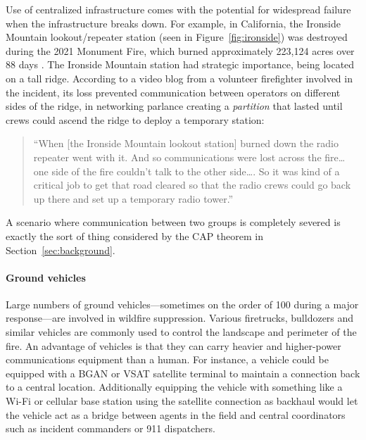\documentclass[]             %
{NASA}                       %
\theoremstyle{definition}
\begin{document}
Use of centralized infrastructure comes with the potential for
widespread failure when the infrastructure breaks down. For example,
in California, the Ironside Mountain lookout/repeater station (seen in
Figure~\ref{fig:ironside}) was destroyed during the 2021 Monument
Fire, which burned approximately 223,124 acres over 88 days
\cite{2021:monumentfire}. The Ironside Mountain station had strategic
importance, being located on a tall ridge. According to a video blog
from a volunteer firefighter involved in the incident, its loss
prevented communication between operators on different sides of the
ridge, in networking parlance creating a \emph{partition} that lasted
until crews could ascend the ridge to deploy a temporary station:
\begin{quote}
  ``When {[}the Ironside Mountain lookout station{]} burned down the
  radio repeater went with it. And so communications were lost across
  the fire\ldots{} one side of the fire couldn't talk to the other
  side\ldots.  So it was kind of a critical job to get that road
  cleared so that the radio crews could go back up there and set up a
  temporary radio tower.'' \cite{2022:mechfire}%
\end{quote}
A scenario where communication between two groups is completely
severed is exactly the sort of thing considered by the CAP theorem in
Section~\ref{sec:background}.

\paragraph{Ground vehicles}
Large numbers of ground vehicles---sometimes on the order of 100
during a major response---are involved in wildfire
suppression. Various firetrucks, bulldozers and similar vehicles are
commonly used to control the landscape and perimeter of the fire. An
advantage of vehicles is that they can carry heavier and higher-power
communications equipment than a human. For instance, a vehicle could
be equipped with a BGAN or VSAT satellite terminal to maintain a
connection back to a central location. Additionally equipping the
vehicle with something like a Wi-Fi or cellular base station using the
satellite connection as backhaul would let the vehicle act as a bridge
between agents in the field and central coordinators such as incident
commanders or 911 dispatchers.
\end{document}
